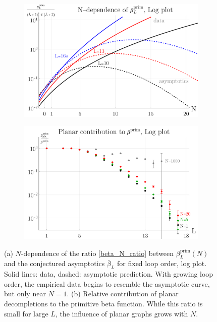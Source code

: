 \documentclass[11pt,a4paper]{article}
\renewcommand{\|}{\rule[-0.4ex]{0.2ex}{1.2em}}
\begin{document}
\begin{figure}[htb]
	\centering
	\begin{subfigure}[b]{.49 \textwidth}
		\includegraphics[width=\linewidth]{beta_N_dependence}
		\subcaption{}
		\label{fig:beta_N_dependence}
	\end{subfigure}
	\begin{subfigure}[b]{.49 \textwidth}
		\includegraphics[width=\linewidth]{beta_planar_relative}
		\subcaption{}
		\label{fig:beta_planar_relative}
	\end{subfigure}
	
	\caption{(a) $N$-dependence of the ratio \cref{beta_N_ratio} between   $\beta^{\text{prim}}_L(N)$ and the conjectured asymptotics $\bar \beta_L$ for fixed loop order, log plot. Solid lines: data, dashed: asymptotic prediction. With growing loop order, the empirical data begins to resemble the asymptotic curve, but  only near $N=1$.
		(b) Relative contribution of planar decompletions to the primitive beta function. While this ratio is small for large $L$, the influence of planar graphs grows with $N$.  
	}
\end{figure}
\end{document}
